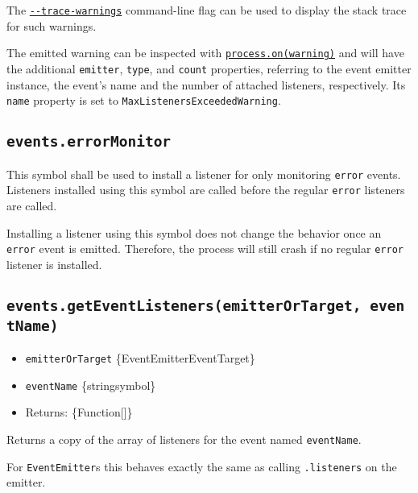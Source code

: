 The \href{cli.md\#--trace-warnings}{\texttt{-\/-trace-warnings}}
command-line flag can be used to display the stack trace for such
warnings.

The emitted warning can be inspected with
\href{process.md\#event-warning}{\texttt{process.on(\textquotesingle{}warning\textquotesingle{})}}
and will have the additional \texttt{emitter}, \texttt{type}, and
\texttt{count} properties, referring to the event emitter instance, the
event's name and the number of attached listeners, respectively. Its
\texttt{name} property is set to
\texttt{\textquotesingle{}MaxListenersExceededWarning\textquotesingle{}}.

\subsection{\texorpdfstring{\texttt{events.errorMonitor}}{events.errorMonitor}}\label{events.errormonitor}

This symbol shall be used to install a listener for only monitoring
\texttt{\textquotesingle{}error\textquotesingle{}} events. Listeners
installed using this symbol are called before the regular
\texttt{\textquotesingle{}error\textquotesingle{}} listeners are called.

Installing a listener using this symbol does not change the behavior
once an \texttt{\textquotesingle{}error\textquotesingle{}} event is
emitted. Therefore, the process will still crash if no regular
\texttt{\textquotesingle{}error\textquotesingle{}} listener is
installed.

\subsection{\texorpdfstring{\texttt{events.getEventListeners(emitterOrTarget,\ eventName)}}{events.getEventListeners(emitterOrTarget, eventName)}}\label{events.geteventlistenersemitterortarget-eventname}

\begin{itemize}
\tightlist
\item
  \texttt{emitterOrTarget} \{EventEmitter\textbar EventTarget\}
\item
  \texttt{eventName} \{string\textbar symbol\}
\item
  Returns: \{Function{[}{]}\}
\end{itemize}

Returns a copy of the array of listeners for the event named
\texttt{eventName}.

For \texttt{EventEmitter}s this behaves exactly the same as calling
\texttt{.listeners} on the emitter.

